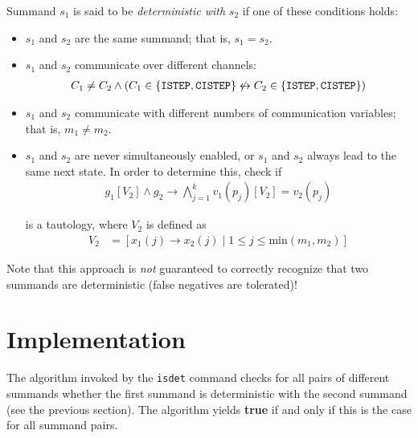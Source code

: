 Summand $s_1$ is said to be \emph{deterministic with} $s_2$ if one of these conditions holds:

\begin{itemize}
\item $s_1$ and $s_2$ are the same summand; that is, $s_1 = s_2$.

\item $s_1$ and $s_2$ communicate over different channels:
\begin{align*}
C_1 \neq C_2 \land (C_1 \in \{\texttt{ISTEP}{}, \texttt{CISTEP}{}\} \not\leftrightarrow C_2 \in \{\texttt{ISTEP}{}, \texttt{CISTEP}{}\})
\end{align*}

\item $s_1$ and $s_2$ communicate with different numbers of communication variables; that is, $m_1 \neq m_2$.

\item $s_1$ and $s_2$ are never simultaneously enabled, or $s_1$ and $s_2$ always lead to the same next state.
In order to determine this, check if
\begin{align*}
g_1[V_2] \land g_2 \rightarrow \bigwedge\limits_{j=1}^{k} v_1(p_j)[V_2] = v_2(p_j)
\end{align*}

is a tautology, where $V_2$ is defined as
\begin{align*}
V_{2} &= [x_1(j) \rightarrow x_2(j) \;|\; 1 \leq j \leq \text{min}(m_1, m_2)]
\end{align*}
\end{itemize}

Note that this approach is \emph{not} guaranteed to correctly recognize that two summands are deterministic (false negatives are tolerated)!

\section{Implementation}

The algorithm invoked by the \texttt{isdet} command checks for all pairs of different summands whether the first summand is deterministic with the second summand (see the previous section).
The algorithm yields \textbf{true} if and only if this is the case for all summand pairs.

%


